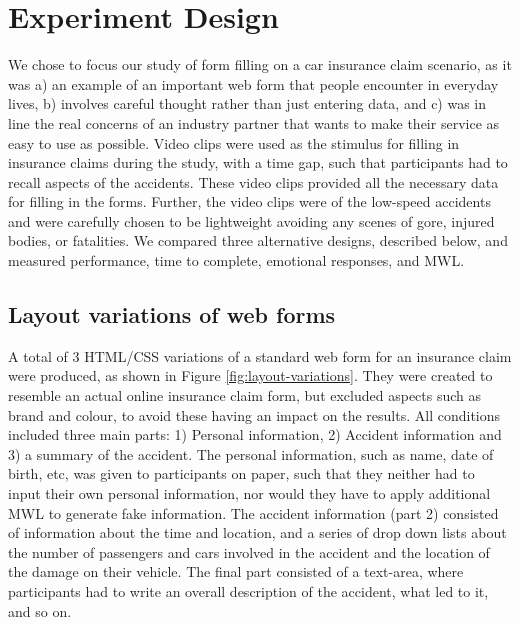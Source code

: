\documentclass[../main/Feedback.tex]{subfiles}
\begin{document}
\section{Experiment Design}
We chose to focus our study of form filling on a car insurance claim scenario, as it was a) an example of an important web form that people encounter in everyday lives, b) involves careful thought rather than just entering data, and c) was in line the real concerns of an industry partner that wants to make their service as easy to use as possible. Video clips were used as the stimulus for filling in insurance claims during the study,  with a time gap, such that participants had to recall aspects of the accidents. These video clips provided all the necessary data for filling in the forms.
Further, the video clips were of the low-speed accidents and were carefully chosen to be lightweight avoiding any scenes of gore, injured bodies, or fatalities. We compared three alternative designs, described below, and measured performance, time to complete, emotional responses, and MWL.

\subsection{Layout variations of web forms}
A total of 3 HTML/CSS variations of a standard web form for an insurance claim were produced, as shown in Figure \ref{fig:layout-variations}.
They were created to resemble an actual online insurance claim form, but excluded aspects such as brand and colour, to avoid these having an impact on the results.
All conditions included three main parts: 1) Personal information, 2) Accident information and 3) a summary of the accident.
The personal information, such as name, date of birth, etc, was given to participants on paper, such that they neither had to input their own personal information, nor would they have to apply additional MWL to generate fake information.
The accident information (part 2) consisted of information about the time and location, and a series of drop down lists about the number of passengers and cars involved in the accident and the location of the damage on their vehicle.
The final part consisted of a text-area, where participants had to write an overall description of the accident, what led to it, and so on. 
\end{document}
